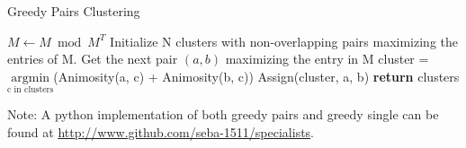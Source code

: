 \documentclass[12pt]{article}
\begin{document}
\begin{algorithm}
    \caption{Greedy Pairs Clustering}
    \label{greedy_pairs}
    \begin{algorithmic}[1] %
         
            \State $M\gets M \bmod M^T$
            \State Initialize N clusters with non-overlapping pairs maximizing the entries of M.
                \State Get the next pair $(a, b)$ maximizing the entry in M
                \State cluster = $\underset{\text{c in clusters}}{\mathrm{argmin}}$(Animosity(a, c) + Animosity(b, c))
                \State Assign(cluster, a, b)
            \EndWhile\label{euclidendwhile}
            \State \textbf{return} clusters
        \EndProcedure
    \end{algorithmic}
\end{algorithm}

Note: A python implementation of both greedy pairs and greedy single can
be found at \url{http://www.github.com/seba-1511/specialists}.




\end{document}
